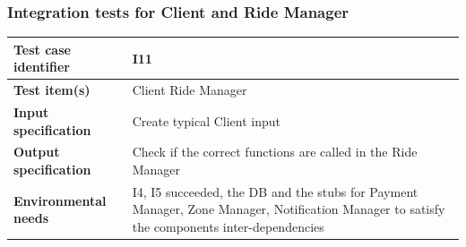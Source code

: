 \documentclass[a4paper,11pt]{report} %
\begin{document}
		\subsubsection{Integration tests for Client and Ride Manager} \label{sec:3.1.8}
			\begin{minipage}{\linewidth}
			\end{minipage}		
		\begin{center}
			\renewcommand{\arraystretch}{1.2}
			\setlength{\tabcolsep}{24pt}
			\begin{tabular}{ l  p{9cm}}\hline
				\textbf{Test case identifier} & I11\\\hline
				\textbf{Test item(s)} & Client \textrightarrow Ride Manager\\\hline
				\textbf{Input specification} & Create typical Client input \\\hline
				\textbf{Output specification} & Check if the correct functions are called in the Ride Manager\\\hline
				\textbf{Environmental needs} &  I4, I5 succeeded, the DB and the stubs for Payment Manager, Zone Manager, Notification Manager to satisfy the components inter-dependencies\\\hline
			\end{tabular}
		\end{center}
		
		\pagebreak		
\end{document}
